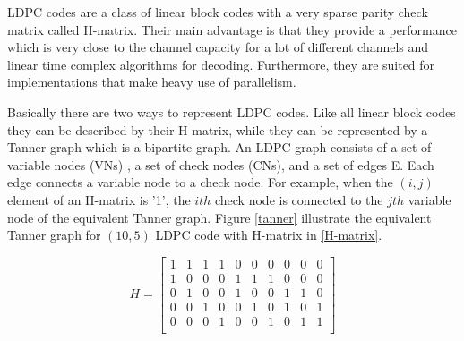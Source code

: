 \documentclass[conference]{IEEEtran}
\begin{document}
LDPC codes are a class of linear block codes with a very sparse parity check matrix called H-matrix. Their main advantage is that they provide a performance which is very close to the channel capacity for a lot of different channels and linear time complex algorithms for decoding. Furthermore, they are suited for implementations that make heavy use of parallelism.

Basically there are two ways to represent LDPC codes. Like all linear block codes they can be described by their H-matrix, while they can be represented by a Tanner graph which is a bipartite graph. An LDPC graph consists of a set of variable nodes (VNs) , a set of check nodes (CNs), and a set of edges E. Each edge connects a variable node to a check node. For example, when the $(i,j)$ element of an H-matrix is '1', the $ith$ check node is connected to the $jth$ variable node of the equivalent Tanner graph. Figure \ref{tanner} illustrate the equivalent Tanner graph for $(10,5)$ LDPC code with H-matrix in \eqref{H-matrix}.

\begin{equation}\label{H-matrix}
H=
  \begin{bmatrix}
    1 & 1 & 1 & 1 & 0 &0 &0 &0 &0 &0 \\
    1 & 0 & 0 & 0 & 1 &1 &1 &0 &0 &0 \\
    0 & 1 & 0 & 0 & 1 &0 &0 &1 &1 &0 \\
    0 & 0 & 1 & 0 & 0 &1 &0 &1 &0 &1 \\
    0 & 0 & 0 & 1 & 0 &0 &1 &0 &1 &1 \\
  \end{bmatrix}
\end{equation}
\end{document}
